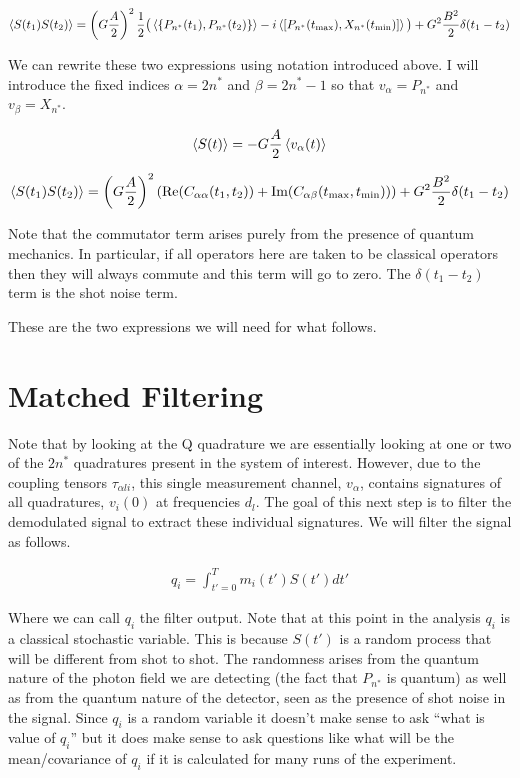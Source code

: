 \documentclass[12pt]{article}
\begin{document}
\begin{align}
\Braket{S(t_1)S(t_2)} = \left(G\frac{A}{2}\right)^2\frac{1}{2}\big(\Braket{\{P_{n^*}(t_1),P_{n^*}(t_2)\}} - i \Braket{[P_{n^*}(t_{\text{max}}),X_{n^*}(t_{\text{min}})]}  \big) + G^2\frac{B^2}{2}\delta(t_1-t_2)
\end{align}

We can rewrite these two expressions using notation introduced above. I will introduce the fixed indices $\alpha = 2n^*$ and $\beta = 2n^*-1$ so that $v_{\alpha} = P_{n^*}$ and $v_{\beta} = X_{n^*}$.

\begin{align}
\Braket{S(t)} = -G\frac{A}{2}\Braket{v_{\alpha}(t)}
\end{align}

\begin{align}
\Braket{S(t_1)S(t_2)} = \left(G\frac{A}{2}\right)^2\left(\text{Re}(C_{\alpha\alpha}(t_1,t_2)) + \text{Im}(C_{\alpha\beta}(t_{\text{max}},t_{\text{min}}))\right) + G^2\frac{B^2}{2}\delta(t_1-t_2)
\end{align}

Note that the commutator term arises purely from the presence of quantum mechanics. In particular, if all operators here are taken to be classical operators then they will always commute and this term will go to zero. The $\delta(t_1-t_2)$ term is the shot noise term.

These are the two expressions we will need for what follows.

\section{Matched Filtering}
Note that by looking at the Q quadrature we are essentially looking at one or two of the $2n^*$ quadratures present in the system of interest. However, due to the coupling tensors $\tau_{\alpha li}$, this single measurement channel, $v_{\alpha}$, contains signatures of all quadratures, $v_i(0)$ at frequencies $d_l$. The goal of this next step is to filter the demodulated signal to extract these individual signatures. We will filter the signal as follows.

\begin{align}
q_i = \int_{t'=0}^T m_i(t') S(t') dt'
\end{align}

Where we can call $q_i$ the filter output. Note that at this point in the analysis $q_i$ is a classical stochastic variable. This is because $S(t')$ is a random process that will be different from shot to shot. The randomness arises from the quantum nature of the photon field we are detecting (the fact that $P_{n^*}$ is quantum) as well as from the quantum nature of the detector, seen as the presence of shot noise in the signal. Since $q_i$ is a random variable it doesn't make sense to ask ``what is value of $q_i$'' but it does make sense to ask questions like what will be the mean/covariance of $q_i$ if it is calculated for many runs of the experiment.
\end{document}
